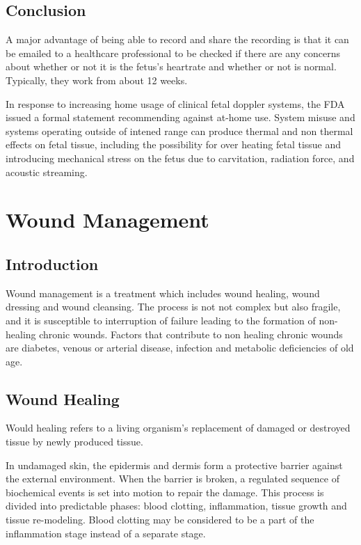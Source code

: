 \documentclass[12pt]{article}
\begin{document}
\subsection{Conclusion}
A major advantage of being able to record and share the recording is that it can be emailed to a healthcare professional to be checked if there are any concerns about whether or not it is the fetus's heartrate and whether or not is normal. Typically, they work from about 12 weeks. 

In response to increasing home usage of clinical fetal doppler systems, the FDA issued a formal statement recommending against at-home use. System misuse and systems operating outside of intened range can produce thermal and non thermal effects on fetal tissue, including the possibility for over heating fetal tissue and introducing mechanical stress on the fetus due to carvitation, radiation force, and acoustic streaming. 
\clearpage

\section{Wound Management}

\subsection{Introduction}
Wound management is a treatment which includes wound healing, wound dressing and wound cleansing. The process is not not complex but also fragile, and it is susceptible to interruption of failure leading to the formation of non-healing chronic wounds. Factors that contribute to non healing chronic wounds are diabetes, venous or arterial disease, infection and metabolic deficiencies of old age.    

\subsection{Wound Healing}
Would healing refers to a living organism's replacement of damaged or destroyed tissue by newly produced tissue.

In undamaged skin, the epidermis and dermis form a protective barrier against the external environment. When the barrier is broken, a regulated sequence of biochemical events is set into motion to repair the damage. This process is divided into predictable phases: blood clotting, inflammation, tissue growth and tissue re-modeling. Blood clotting may be considered to be a part of the inflammation stage instead of a separate stage. 
\end{document}
